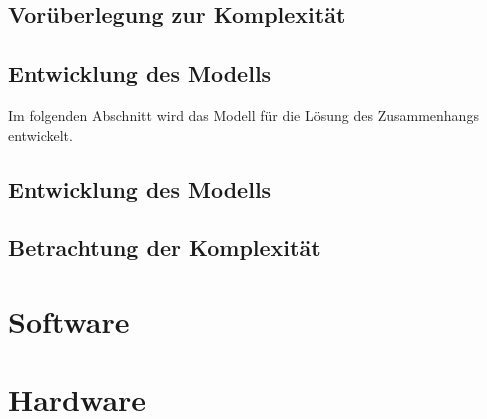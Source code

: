 \subsection{Vorüberlegung zur Komplexität}
\label{sec:Komplexity1}

\subsection{Entwicklung des Modells}
\label{sec:model_developement}
Im folgenden Abschnitt wird das Modell für die Lösung des Zusammenhangs entwickelt.
%
\subsection{Entwicklung des Modells}





\subsection{Betrachtung der Komplexität}
\label{sec:Komplexity2}

\section{Software}
\label{sec:sw}
\lipsum[1-3]

\section{Hardware}
\label{sec:hw}
\lipsum[1-3]
